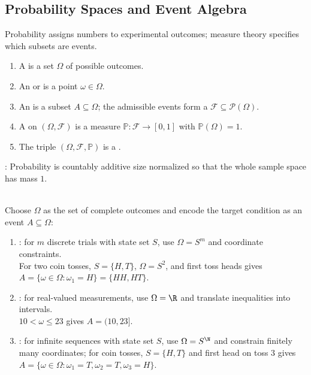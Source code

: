 \subsection{Probability Spaces and Event Algebra}

Probability assigns numbers to experimental outcomes; measure theory specifies which subsets are events.

\begin{definition} \label{def:probability-space-random-variable-law}\label{def:sample-space-events-and-probability-space} 
\begin{enumerate}[label=(\roman*)]
\setlength{\itemsep}{0pt}
\item A  is a set $\Omega$ of possible outcomes.
\item An  or  is a point $\omega\in\Omega$.
\item An  is a subset $A\subseteq\Omega$; the admissible events form a  $\mathcal{F}\subseteq\mathcal{P}(\Omega)$.
\item A  on $(\Omega,\mathcal{F})$ is a measure $\mathbb{P}:\mathcal{F}\to[0,1]$ with $\mathbb{P}(\Omega)=1$.
\item The triple $(\Omega,\mathcal{F},\mathbb{P})$ is a .
\end{enumerate}
: Probability is countably additive size normalized so that the whole sample space has mass $1$.
\end{definition}

\begin{method} \label{meth:first-sample-spaces} \\
Choose $\Omega$ as the set of complete outcomes and encode the target condition as an event $A\subseteq\Omega$:
\begin{enumerate}[label=(\roman*)]
\setlength{\itemsep}{0pt}
\item {}: for $m$ discrete trials with state set $S$, use $\Omega=S^m$ and coordinate constraints.\\
For two coin tosses, $S=\{H,T\}$, $\Omega=S^2$, and first toss heads gives $A=\{\omega\in\Omega:\omega_1=H\}=\{HH,HT\}$.
\item {}: for real-valued measurements, use $\Omega=\R$ and translate inequalities into intervals.\\
$10<\omega\leq23$ gives $A=(10,23]$.
\item {}: for infinite sequences with state set $S$, use $\Omega=S^{\N}$ and constrain finitely many coordinates; for coin tosses, $S=\{H,T\}$ and first head on toss $3$ gives $A=\{\omega\in\Omega:\omega_1=T,\omega_2=T,\omega_3=H\}$.
\end{enumerate}
\end{method}

